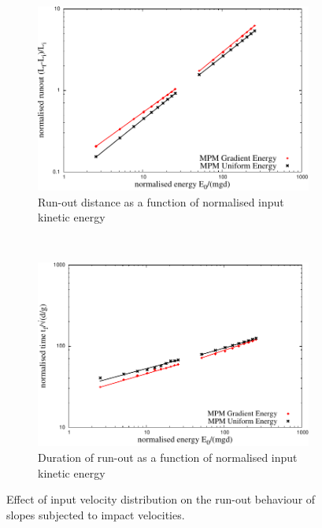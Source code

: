 \begin{figure}[tbph]
\centering
\begin{subfigure}[b]{0.95\textwidth}
\centering
\includegraphics[width=\textwidth]{Runout_Eo_GU}
\caption{Run-out distance as a function of normalised input kinetic energy}
\label{fig:Runout_Eo_GU}
\end{subfigure}
\\
\begin{subfigure}[b]{0.95\textwidth}
\centering
\includegraphics[width=\textwidth]{time_Eo_GU}
\caption{Duration of run-out as a function of normalised input kinetic energy}
\label{fig:time_Eo_GU}
\end{subfigure}
\caption{Effect of input velocity distribution on the run-out behaviour of 
slopes subjected to impact velocities.}
\label{fig:GU}
\end{figure}



